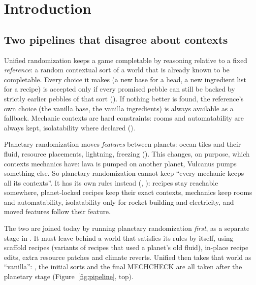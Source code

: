 \section{Introduction}\label{sec:intro}

\subsection{Two pipelines that disagree about contexts}

Unified randomization keeps a game completable by reasoning relative to a fixed \emph{reference}: a random contextual sort of a world that is already known to be completable. Every choice it makes (a new base for a head, a new ingredient list for a recipe) is accepted only if every promised pebble can still be backed by strictly earlier pebbles of that sort (). If nothing better is found, the reference's own choice (the vanilla base, the vanilla ingredients) is always available as a fallback. Mechanic contexts are hard constraints: rooms and automatability are always kept, isolatability where declared ().

Planetary randomization moves \emph{features} between planets: ocean tiles and their fluid, resource placements, lightning, freezing (). This changes, on purpose, which contexts mechanics have: lava is pumped on another planet, Vulcanus pumps something else. So planetary randomization cannot keep ``every mechanic keeps all its contexts''. It has its own rules instead (, ): recipes stay reachable somewhere, planet-locked recipes keep their exact contexts, mechanics keep rooms and automatability, isolatability only for rocket building and electricity, and moved features follow their feature.

The two are joined today by running planetary randomization \emph{first}, as a separate stage in . It must leave behind a world that satisfies its rules by itself, using scaffold recipes (variants of recipes that used a planet's old fluid), in-place recipe edits, extra resource patches and climate reverts. Unified then takes that world as ``vanilla'': , the initial sorts and the final MECHCHECK are all taken after the planetary stage (Figure~\ref{fig:pipeline}, top).

